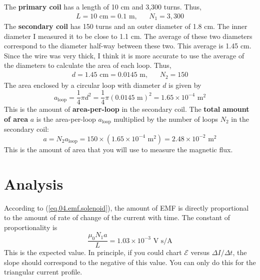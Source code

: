 The \textbf{primary coil} has a length of 10 cm and 3,300 turns. Thus,
\begin{align}
	L = 10 \text{ cm} = 0.1 \text{ m}, && N_{1} = 3,300
\end{align}
The \textbf{secondary coil} has 150 turns and an outer diameter of 1.8 cm. The inner diameter I measured it to be close to 1.1 cm. The average of these two diameters correspond to the diameter half-way between these two. This average is 1.45 cm. Since the wire was very thick, I think it is more accurate to use the average of the diameters to calculate the area of each loop. Thus,
\begin{align}
	d = 1.45 \text{ cm} = 0.0145 \text{ m}, && N_{2} = 150
\end{align}
The area enclosed by a circular loop with diameter $d$ is given by
\begin{equation}
	a_{\text{loop}} = \frac{1}{4} \pi d^{2} = \frac{1}{4} \pi (0.0145 \text{ m})^2 = 1.65 \times 10^{-4} \text{ m}^{2}
\end{equation}
This is the amount of \textbf{area-per-loop} in the secondary coil. The \textbf{total amount of area} $a$ is the area-per-loop $a_{\text{loop}}$ multiplied by the number of loops $N_{2}$ in the secondary coil:
\begin{equation}
	a = N_{2} a_{\text{loop}} = 150 \times (1.65 \times 10^{-4} \text{ m}^{2}) = 2.48 \times 10^{-2} \text{ m}^{2}
\end{equation}
This is the amount of area that you will use to measure the magnetic flux.
%
\section{Analysis}
%
According to (\ref{eq.04.emf.solenoid}), the amount of EMF is directly proportional to the amount of rate of change of the current with time. The constant of proportionality is
\begin{equation}
	\frac{\mu_{0} N_{1} a}{L} = 1.03 \times 10^{-3} \text{ V s/A}
	\label{eq.04.slope}
\end{equation}
This is the expected value. In principle, if you could chart $\mathcal{E}$ versus $\Delta I / \Delta t$, the slope should correspond to the negative of this value. You can only do this for the triangular current profile.
%
